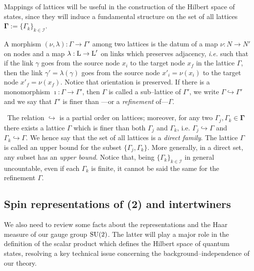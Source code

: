 Mappings of lattices will be useful in the construction of the Hilbert space of states, since they will induce a fundamental structure on the set of all lattices $\boldsymbol{\Gamma}:=\{\Gamma_k\}_{k\in\mathcal{I}}$. %
\begin{defi}
    A morphism $(\nu,\lambda):\Gamma\to\Gamma'$ among two lattices is the datum of a map $\nu:N\to N'$ on nodes and a map $\lambda:\text{\normalfont L}\to\text{\normalfont L}'$ on links which preserves adjacency, \emph{i.e.} such that if the link $\gamma$ goes from the source node $x_i$ to the target node $x_f$ in the lattice $\Gamma$, then the link $\gamma'=\lambda(\gamma)$ goes from the source node ${x'}_i=\nu(x_i)$ to the target node ${x'}_f=\nu(x_f)$. Notice that orientation is preserved.
If there is a monomorphism $\imath:\Gamma\to\Gamma'$, then $\Gamma$ is called a sub--lattice of $\Gamma'$, we write $\Gamma\hookrightarrow\Gamma'$ and we say that $\Gamma'$ is finer than ---or a \emph{refinement} of---$\Gamma$. 

\end{defi}
\,\newline
The relation $\hookrightarrow$ is a partial order on lattices; moreover, for any two $\Gamma_j,\Gamma_k\in\boldsymbol{\Gamma}$ there exists a lattice $\Gamma$ which is finer than both $\Gamma_j$ and $\Gamma_k$, i.e.
$\Gamma_j\hookrightarrow\Gamma$ and $\Gamma_k\hookrightarrow\Gamma$. We hence say that the set of all lattices is a \emph{direct family}. The lattice $\Gamma$ is called an upper bound
for the subset $\{\Gamma_j,\Gamma_k\}$. More generally, in a direct set, any subset has an \emph{upper bound}. Notice that, being $\{\Gamma_k\}_{k\in\mathcal{I}}$
 in general uncountable, even if each $\Gamma_k$ is finite, it cannot be said the same for the refinement $\Gamma$.

\subsection{Spin representations of \texorpdfstring{\SU(2)}{a} and intertwiners}\label{repr_su}

We also need to review some facts about the representations and the Haar measure of our gauge group $\text{\normalfont SU}(2)$. The latter will play a major role in the definition of the scalar product which defines the Hilbert space of quantum states, resolving a key technical issue concerning the background--independence of our theory.


